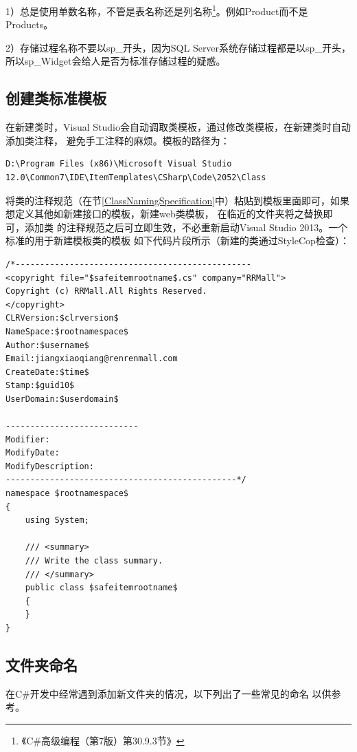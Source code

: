 \documentclass{book}
\begin{document}
1）总是使用单数名称，不管是表名称还是列名称\footnote{《C\#高级编程（第7版）第30.9.3节》}。例如Product而不是Products。	

2）存储过程名称不要以sp\_开头，因为SQL Server系统存储过程都是以sp\_开头，所以sp\_Widget会给人是否为标准存储过程的疑惑。

\subsection{创建类标准模板}

在新建类时，Visual Studio会自动调取类模板，通过修改类模板，在新建类时自动添加类注释，
避免手工注释的麻烦。模板的路径为：
\begin{lstlisting}
D:\Program Files (x86)\Microsoft Visual Studio 12.0\Common7\IDE\ItemTemplates\CSharp\Code\2052\Class
\end{lstlisting}

将类的注释规范（在节\ref{ClassNamingSpecification}中）粘贴到模板里面即可，如果想定义其他如新建接口的模板，新建web类模板，
在临近的文件夹将之替换即可，添加类
的注释规范之后可立即生效，不必重新启动Visual Studio 2013。一个标准的用于新建模板类的模板
如下代码片段所示（新建的类通过StyleCop检查）：

\begin{lstlisting}[language={[Sharp]C}]
/*------------------------------------------------
<copyright file="$safeitemrootname$.cs" company="RRMall">
Copyright (c) RRMall.All Rights Reserved.
</copyright>
CLRVersion:$clrversion$
NameSpace:$rootnamespace$ 
Author:$username$
Email:jiangxiaoqiang@renrenmall.com
CreateDate:$time$
Stamp:$guid10$
UserDomain:$userdomain$

---------------------------
Modifier:
ModifyDate:
ModifyDescription:
-----------------------------------------------*/
namespace $rootnamespace$
{
	using System;
	
	/// <summary>
    /// Write the class summary. 
    /// </summary>
    public class $safeitemrootname$
    {
    }
}
\end{lstlisting}

\subsection{文件夹命名}

在C\#开发中经常遇到添加新文件夹的情况，以下列出了一些常见的命名
以供参考。
\end{document}
